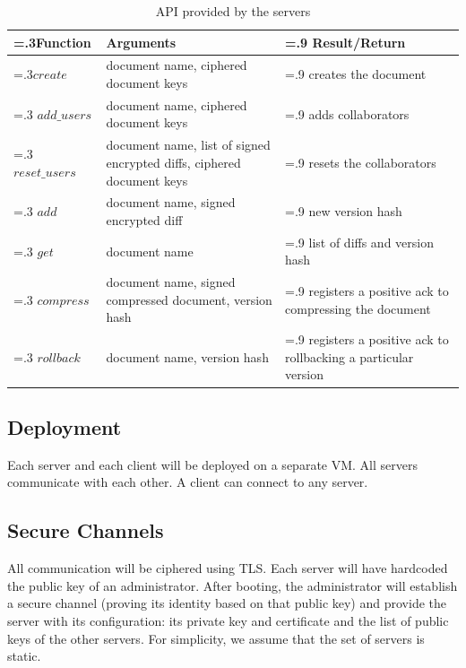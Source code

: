 \begin{table}[ht]
    \centering
    \caption{API provided by the servers}
    \begin{tabularx}{\textwidth}{>{\hsize=.3\hsize}X | X | >{\hsize=.9\hsize}X }
        \hline
        \textbf{Function} & \textbf{Arguments} & \textbf{Result/Return} \\
        \hline
        $create$ & document name, ciphered document keys & creates the document \\
        \hline
        $add\_users$ & document name, ciphered document keys & adds collaborators  \\
        \hline
        $reset\_users$ & document name, list of signed encrypted diffs, ciphered document keys & resets the collaborators  \\
        \hline
        $add$ & document name, signed encrypted diff & new version hash \\
        \hline
        $get$ & document name & list of diffs and version hash \\
        \hline
        $compress$ & document name, signed compressed document, version hash & registers a positive ack to compressing the document\\
        \hline
        $rollback$ & document name, version hash & registers a positive ack to rollbacking a particular version\\
        \hline
    \end{tabularx}
    \label{tab:api}
\end{table}

\subsection{Deployment}

Each server and each client will be deployed on a separate VM.
All servers communicate with each other. A client can connect to
any server.

\subsection{Secure Channels}

All communication will be ciphered using TLS. Each server will
have hardcoded the public key of an administrator. After booting,
the administrator will establish a secure channel (proving its
identity based on that public key) and provide the server with
its configuration: its private key and certificate and the list
of public keys of the other servers. For simplicity, we assume
that the set of servers is static.

